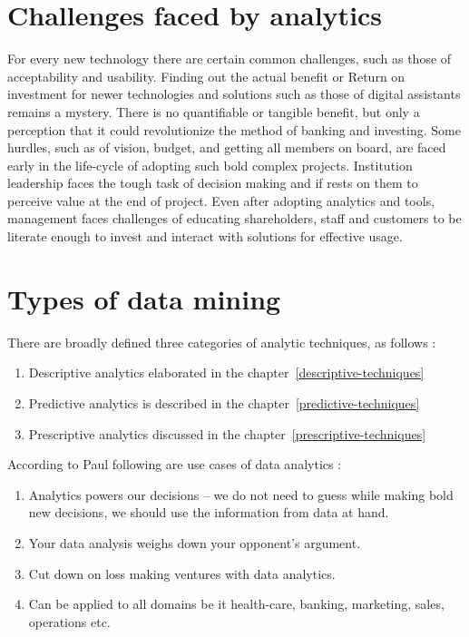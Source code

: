 \newpage
\section{Challenges faced by analytics}
For every new technology there are certain common challenges, such as those of acceptability and usability. Finding out the actual benefit or Return on investment for newer technologies and solutions such as those of digital assistants remains a mystery. There is no quantifiable or tangible benefit, but only a perception that it could revolutionize the method of banking and investing.
Some hurdles, such as of vision, budget, and getting all members on board, are faced early in the life-cycle of adopting such bold complex projects. Institution leadership faces the tough task of decision making and if rests on them to perceive value at the end of project.
Even after adopting analytics and tools, management faces challenges of educating shareholders, staff and customers to be literate enough to invest and interact with solutions for effective usage.

\section{Types of data mining}
There are broadly defined three categories of analytic techniques, as follows :
\begin{enumerate}
	\item Descriptive analytics elaborated in the chapter~\ref{descriptive-techniques}
	\item Predictive analytics is described in the chapter~\ref{predictive-techniques}
	\item Prescriptive analytics discussed in the chapter~\ref{prescriptive-techniques}
\end{enumerate}

According to Paul following are use cases  of data analytics :
\begin{enumerate}
	\item Analytics powers our decisions – we do not need to guess while making bold new decisions, we should use the information from data at hand.
	\item Your data analysis weighs down your opponent's argument.
	\item Cut down on loss making ventures with data analytics.
	\item Can be applied to all domains be it health-care, banking, marketing, sales, operations etc.
\end{enumerate}

